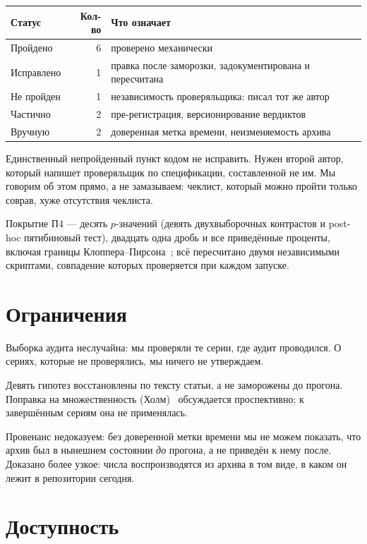 \documentclass[11pt]{article}
\begin{document}
\begin{center}
\begin{tabular}{@{}lrl@{}}
\toprule
Статус & Кол-во & Что означает \\
\midrule
Пройдено   & 6 & проверено механически \\
Исправлено & 1 & правка после заморозки, задокументирована и пересчитана \\
Не пройден & 1 & независимость проверяльщика: писал тот же автор \\
Частично   & 2 & пре-регистрация, версионирование вердиктов \\
Вручную    & 2 & доверенная метка времени, неизменяемость архива \\
\bottomrule
\end{tabular}
\end{center}

Единственный непройденный пункт кодом не исправить. Нужен второй автор, который
напишет проверяльщик по спецификации, составленной не им. Мы говорим об этом
прямо, а не замазываем: чеклист, который можно пройти только соврав, хуже
отсутствия чеклиста.

Покрытие П4 — десять $p$-значений (девять двухвыборочных контрастов и
post-hoc пятибиновый тест), двадцать одна дробь и все приведённые
проценты, включая границы Клоппера–Пирсона~\cite{clopper1934}; всё пересчитано двумя независимыми
скриптами, совпадение которых проверяется при каждом запуске.

\section{Ограничения}

Выборка аудита неслучайна: мы проверяли те серии, где аудит проводился. О
сериях, которые не проверялись, мы ничего не утверждаем.

Девять гипотез восстановлены по тексту статьи, а не заморожены до прогона.
Поправка на множественность (Холм)~\cite{holm1979} обсуждается проспективно; к завершённым
сериям она не применялась.

Провенанс недоказуем: без доверенной метки времени мы не можем показать, что
архив был в нынешнем состоянии \emph{до} прогона, а не приведён к нему после.
Доказано более узкое: числа воспроизводятся из архива в том виде, в каком он
лежит в репозитории сегодня.

\section{Доступность}
\end{document}
